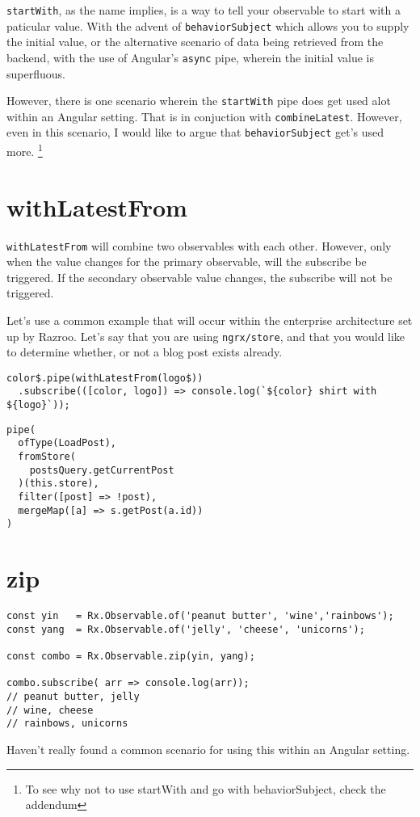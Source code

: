 \lstinline{startWith}, as the name implies, is a way to tell your observable 
to start with a paticular value. With the advent of \lstinline{behaviorSubject}
which allows you to supply the initial value, or the alternative scenario 
of data being retrieved from the backend, with the use of Angular's 
\lstinline{async} pipe, wherein the initial value is superfluous. 

However, there is one scenario wherein the \lstinline{startWith} pipe does get
used alot within an Angular setting. That is in conjuction with 
\lstinline{combineLatest}. However, even in this scenario, I would like to argue
that \lstinline{behaviorSubject} get's used more. \footnote{To see why not to 
use startWith and go with behaviorSubject, check the addendum}

\section{withLatestFrom}
\lstinline{withLatestFrom} will combine two observables with each other. However,
only when the value changes for the primary observable, will the subscribe be 
triggered. If the secondary observable value changes, the subscribe will not be 
triggered. 

Let's use a common example that will occur within the enterprise architecture 
set up by Razroo. Let's say that you are using \lstinline{ngrx/store}, and
that you would like to determine whether, or not a blog post exists already. 

\begin{lstlisting}
color$.pipe(withLatestFrom(logo$))
  .subscribe(([color, logo]) => console.log(`${color} shirt with ${logo}`));
\end{lstlisting}

\begin{lstlisting}[caption=data-access-post.ts]
pipe(
  ofType(LoadPost),
  fromStore(
    postsQuery.getCurrentPost
  )(this.store),
  filter([post] => !post),
  mergeMap([a] => s.getPost(a.id))
)
\end{lstlisting}

\section{zip}

\begin{lstlisting}[caption=yin-yang.component.ts]
const yin   = Rx.Observable.of('peanut butter', 'wine','rainbows');
const yang  = Rx.Observable.of('jelly', 'cheese', 'unicorns');

const combo = Rx.Observable.zip(yin, yang);

combo.subscribe( arr => console.log(arr));
// peanut butter, jelly
// wine, cheese
// rainbows, unicorns  
\end{lstlisting}

Haven't really found a common scenario for using this within an Angular 
setting.